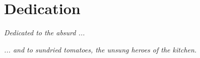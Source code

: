 \chapter*{{\color{white}Dedication}}

\vspace{3cm}
\begin{flushright}
	{\em Dedicated to the absurd ... }
\end{flushright}
\vspace*{8cm}
\emph{... and to sundried tomatoes,  the unsung heroes of the kitchen. }
